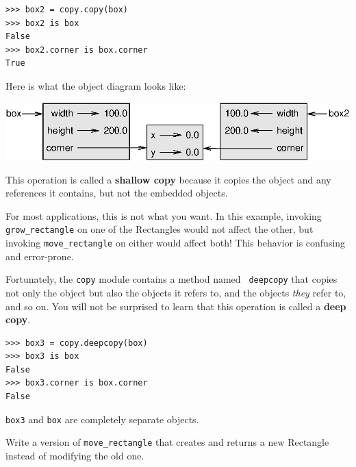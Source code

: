 \documentclass[10pt]{book}
\begin{document}
{

\beforeverb
\begin{verbatim}
>>> box2 = copy.copy(box)
>>> box2 is box
False
>>> box2.corner is box.corner
True
\end{verbatim}
\afterverb
%
Here is what the object diagram looks like:


\vspace{0.1in}
\beforefig
\centerline{\includegraphics{figs/rectangle2.eps}}
\afterfig
\vspace{0.1in}

This operation is called a {\bf shallow copy} because it copies the
object and any references it contains, but not the embedded objects.


For most applications, this is not what you want.  In this example,
invoking \verb"grow_rectangle" on one of the Rectangles would not
affect the other, but invoking \verb"move_rectangle" on either would
affect both!  This behavior is confusing and error-prone.


Fortunately, the {\tt copy} module contains a method named {\tt
deepcopy} that copies not only the object but also 
the objects it refers to, and the objects {\em they} refer to,
and so on.
You will not be surprised to learn that this operation is
called a {\bf deep copy}.


\beforeverb
\begin{verbatim}
>>> box3 = copy.deepcopy(box)
>>> box3 is box
False
>>> box3.corner is box.corner
False
\end{verbatim}
\afterverb
%
{\tt box3} and {\tt box} are completely separate objects.


\begin{ex}
Write a version of \verb"move_rectangle" that creates and
returns a new Rectangle instead of modifying the old one.
\end{ex}


}
\end{document}
